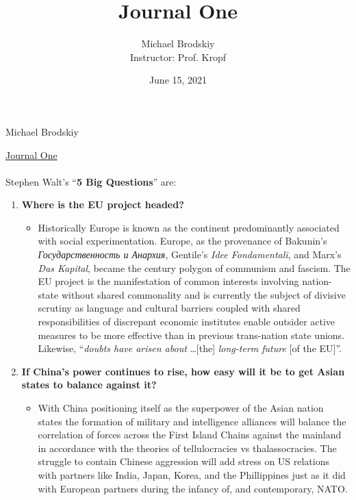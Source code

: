 \documentclass[12pt]{article}
\title{Journal One}
\date{June 15, 2021}
\author{Michael Brodskiy\\ \small Instructor: Prof. Kropf}
\begin{document}
\flushleft Michael Brodskiy

\begin{center}

 \underline{Journal One}

\end{center}

\begin{justify}

  \paragraph{} Stephen Walt's “\textbf{5 Big Questions}” are:
  \singlespacing
  \begin{enumerate}
    \item \textbf{Where is the EU project headed?}
      \begin{itemize}
        \item Historically Europe is known as the continent predominantly associated with social experimentation. Europe, as the provenance of Bakunin's \emph{Государственность и Анархия}, Gentile's \emph{Idee Fondamentali}, and Marx's \emph{Das Kapital}, became the  century polygon of communism and fascism. The EU project is the manifestation of common interests involving nation-state without shared commonality and is currently the subject of divisive scrutiny as language and cultural barriers coupled with shared responsibilities of discrepant economic institutes enable outsider active measures to be more effective than in previous trans-nation state unions. Likewise, “\emph{doubts have arisen about} \dots [the] \emph{long-term future} [of the EU]”. 
      \end{itemize}
    \item \textbf{If China’s power continues to rise, how easy will it be to get Asian states to balance against it?}
      \begin{itemize}
        \item With China positioning itself as the superpower of the Asian nation states the formation of military and intelligence alliances will balance the correlation of forces across the First Island Chains against the mainland in accordance with the theories of tellulocracies vs thalassocracies. The struggle to contain Chinese aggression will add stress on US relations with partners like India, Japan, Korea, and the Phillippines just as it did with European partners during the infancy of, and contemporary, NATO.
      \end{itemize}

\end{enumerate}
\end{justify}
\end{document}
